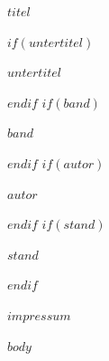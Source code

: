 \documentclass[
  fontsize=10pt,
  paper=$papierbreite$:$papierhoehe$,
  twoside,
  open=right,
  cleardoublepage=empty,
  parskip=false,
$if(druck)$
  bookmarkpackage=false,
$endif$
]{scrbook}
\begin{document}
\frontmatter
\pagestyle{empty}

\begin{titlepage}
  \centering
  \null\vspace*{0.20\textheight}
  {\Huge\bfseries $titel$\par}
  $if(untertitel)$
  \vspace{1.6em}
  \begin{minipage}{0.84\textwidth}
    \centering
    {\large\itshape\color{akzent}$untertitel$\par}
  \end{minipage}\par
  $endif$
  $if(band)$
  \vspace{2.2em}
  {\large\scshape\color{akzent}$band$\par}
  $endif$
  $if(autor)$
  \vspace{3.4em}
  {\large $autor$\par}
  $endif$
  \vfill
  $if(stand)$
  {\small\color{leise}$stand$\par}
  $endif$
\end{titlepage}

%
\thispagestyle{empty}
\null\vfill
{\footnotesize\color{leise}\raggedright
  \setlength{\parskip}{0.7em}%
  \setlength{\parindent}{0pt}%
$impressum$
\par}
\cleardoublepage

\pagestyle{scrheadings}
\tableofcontents

$body$

\cleardoublepage
\end{document}
